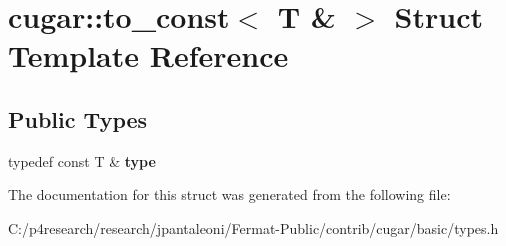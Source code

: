 \hypertarget{structcugar_1_1to__const_3_01_t_01_6_01_4}{}\section{cugar\+:\+:to\+\_\+const$<$ T \& $>$ Struct Template Reference}
\label{structcugar_1_1to__const_3_01_t_01_6_01_4}
\subsection*{Public Types}
\begin{DoxyCompactItemize}
\item 
\mbox{\label{structcugar_1_1to__const_3_01_t_01_6_01_4_a6321470737088bccdd96d8ee5755c666}} 
typedef const T \& {\bfseries type}
\end{DoxyCompactItemize}


The documentation for this struct was generated from the following file\+:\begin{DoxyCompactItemize}
\item 
C\+:/p4research/research/jpantaleoni/\+Fermat-\/\+Public/contrib/cugar/basic/types.\+h\end{DoxyCompactItemize}
